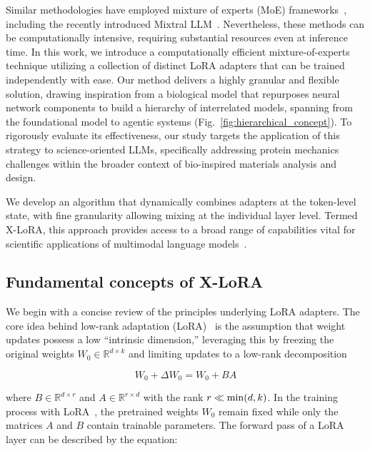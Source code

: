 Similar methodologies have employed mixture of experts (MoE) frameworks~\cite{Jacobs1991AdaptiveExperts,Hampshire1992TheRecognition,Jordan1994HierarchicalAlgorithm}, including the recently introduced Mixtral LLM~\cite{Jiang2024MixtralExperts}. Nevertheless, these methods can be computationally intensive, requiring substantial resources even at inference time. In this work, we introduce a computationally efficient mixture-of-experts technique utilizing a collection of distinct LoRA adapters that can be trained independently with ease. Our method delivers a highly granular and flexible solution, drawing inspiration from a biological model that repurposes neural network components to build a hierarchy of interrelated models, spanning from the foundational model to agentic systems (Fig.~\ref{fig:hierarchical_concept}). To rigorously evaluate its effectiveness, our study targets the application of this strategy to science-oriented LLMs, specifically addressing protein mechanics challenges within the broader context of bio-inspired materials analysis and design.

We develop an algorithm that dynamically combines adapters at the token-level state, with fine granularity allowing mixing at the individual layer level. Termed X-LoRA, this approach provides access to a broad range of capabilities vital for scientific applications of multimodal language models~\cite{Hu2023DeepScience,Buehler2023AMetamaterials,Buehler2022ProteinNetworks,}. 

\subsection{Fundamental concepts of X-LoRA}

We begin with a concise review of the principles underlying LoRA adapters. The core idea behind low-rank adaptation (LoRA)~\cite{hu2021lora} is the assumption that weight updates possess a low “intrinsic dimension,” leveraging this by freezing the original weights $W_0 \in \mathbb{R}^{d \times k}$ and limiting updates to a low-rank decomposition

\begin{equation}
W_0 + \Delta W_0 = W_0 + BA 
\end{equation}

where $B \in \mathbb{R}^{d \times r}$ and $A \in \mathbb{R}^{r \times d}$ with the rank $r \ll {\rm min}(d,k)$. In the training process with LoRA~\cite{hu2021lora}, the pretrained weights $W_0$ remain fixed while only the matrices $A$ and $B$ contain trainable parameters. The forward pass of a LoRA layer can be described by the equation:

